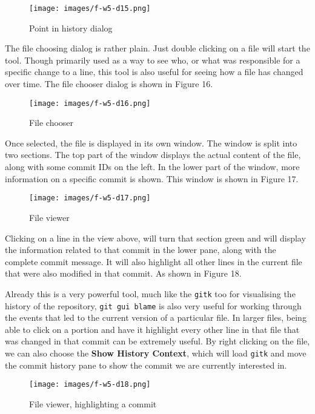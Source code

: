 \begin{figure}[hbt]
\centering
\texttt{[image: images/f-w5-d15.png]}
\caption{Point in history dialog}
\end{figure} 

The file choosing dialog is rather plain.  Just double clicking on a file will start the  tool.  Though primarily used as a way to see who, or what was responsible for a specific change to a line, this tool is also useful for seeing how a file has changed over time.  The file chooser dialog is shown in Figure 16.

\begin{figure}[hbt]
\centering
\texttt{[image: images/f-w5-d16.png]}
\caption{File chooser}
\end{figure} 

Once selected, the file is displayed in its own window.  The window is split into two sections.  The top part of the window displays the actual content of the file, along with some commit IDs on the left.  In the lower part of the window, more information on a specific commit is shown.  This window is shown in Figure 17.

\begin{figure}[hbt]
\centering
\texttt{[image: images/f-w5-d17.png]}
\caption{File viewer}
\end{figure} 

Clicking on a line in the view above, will turn that section green and will display the information related to that commit in the lower pane, along with the complete commit message.  It will also highlight all other lines in the current file that were also modified in that commit.  As shown in Figure 18.

Already this is a very powerful tool, much like the \texttt{gitk} too for visualising the history of the repository, \texttt{git gui blame} is also very useful for working through the events that led to the current version of a particular file.  In larger files, being able to click on a portion and have it highlight every other line in that file that was changed in that commit can be extremely useful.  By right clicking on the file, we can also choose the \textbf{Show History Context}, which will load \texttt{gitk} and move the commit history pane to show the commit we are currently interested in.

\begin{figure}[hbt]
\centering
\texttt{[image: images/f-w5-d18.png]}
\caption{File viewer, highlighting a commit}
\end{figure} 

